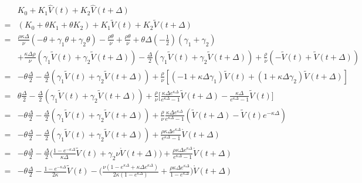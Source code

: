 \documentclass{ws-ijfe}
\begin{document}
\begin{equation}\label{QEK0K1K2}
\begin{split}
&K_0+K_1\hat{V}(t)+K_2\hat{V}(t+\Delta)\\
=&(K_0+\theta K_1+\theta K_2)+K_1\tilde{V}(t)+K_2\tilde{V}(t+\Delta)\\
=&\frac{\rho\kappa\Delta}{\nu}(-\theta+\gamma_1\theta+\gamma_2\theta)-\frac{\rho\theta}{\nu}+\frac{\rho\theta}{\nu}+\theta\Delta(-\frac{1}{2})(\gamma_1+\gamma_2)\\
&+\frac{\kappa\Delta\rho}{\nu}(\gamma_1\tilde{V}(t)+\gamma_2\tilde{V}(t+\Delta))-\frac{\Delta}{2}(\gamma_1\tilde{V}(t)+\gamma_2\tilde{V}(t+\Delta))+\frac{\rho}{\nu}(-\tilde{V}(t)+\tilde{V}(t+\Delta))\\
=&-\theta\frac{\Delta}{2}-\frac{\Delta}{2}(\gamma_1\tilde{V}(t)+\gamma_2\tilde{V}(t+\Delta))+\frac{\rho}{\nu}[(-1+\kappa\Delta\gamma_1)\tilde{V}(t)+(1+\kappa\Delta\gamma_2)\tilde{V}(t+\Delta)]\\
=&\theta\frac{\Delta}{2}-\frac{\Delta}{2}(\gamma_1\tilde{V}(t)+\gamma_2\tilde{V}(t+\Delta))+\frac{\rho}{\nu}\bigg[\frac{\kappa\Delta e^{\kappa\Delta}}{e^{\kappa\Delta}-1}\tilde{V}(t+\Delta)-\frac{\kappa\Delta}{e^{\kappa\Delta}-1}\tilde{V}(t)\bigg]\\
=&-\theta\frac{\Delta}{2}-\frac{\Delta}{2}(\gamma_1\tilde{V}(t)+\gamma_2\tilde{V}(t+\Delta))+\frac{\rho}{\nu}\frac{\kappa\Delta e^{\kappa\Delta}}{e^{\kappa\Delta}-1}(\tilde{V}(t+\Delta)-\tilde{V}(t)e^{-\kappa\Delta})\\
=&-\theta\frac{\Delta}{2}-\frac{\Delta}{2}(\gamma_1\tilde{V}(t)+\gamma_2\tilde{V}(t+\Delta))+\frac{\rho\kappa\Delta e^{\kappa\Delta}}{e^{\kappa\Delta}-1}\mathring{V}(t+\Delta)\\
=&-\theta\frac{\Delta}{2}-\frac{\Delta}{2}\bigg(\frac{1-e^{-\kappa\Delta}}{\kappa\Delta}\tilde{V}(t)+\gamma_2\nu\mathring{V}(t+\Delta)\bigg)+\frac{\rho\kappa\Delta e^{\kappa\Delta}}{e^{\kappa\Delta}-1}\mathring{V}(t+\Delta)\\
=&-\theta\frac{\Delta}{2}-\frac{1-e^{-\kappa\Delta}}{2\kappa}\tilde{V}(t)-\bigg(\frac{\nu(1-e^{\kappa\Delta}+\kappa\Delta e^{\kappa\Delta})}{2\kappa(1-e^{\kappa\Delta})}+\frac{\rho\kappa\Delta e^{\kappa\Delta}}{1-e^{\kappa\Delta}}\bigg)\mathring{V}(t+\Delta)
\end{split}
\end{equation}
%
\end{document}
